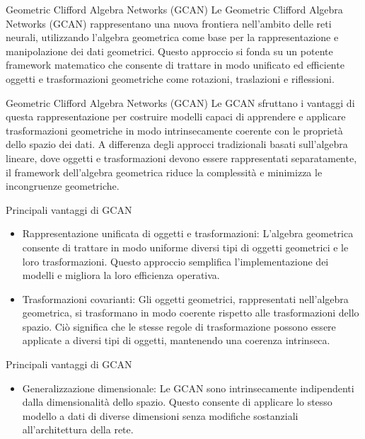 \begin{frame}{Geometric Clifford Algebra Networks (GCAN)}
   Le Geometric Clifford Algebra Networks (GCAN) rappresentano una nuova frontiera nell’ambito delle reti neurali, utilizzando l’algebra geometrica come base per la rappresentazione e manipolazione dei dati geometrici. 
   Questo approccio si fonda su un potente framework matematico che consente di trattare in modo unificato ed efficiente oggetti e trasformazioni geometriche come rotazioni, traslazioni e riflessioni.
\end{frame}

\begin{frame}{Geometric Clifford Algebra Networks (GCAN)}
   Le GCAN sfruttano i vantaggi di questa rappresentazione per costruire modelli capaci di apprendere e applicare trasformazioni geometriche in modo intrinsecamente coerente con le proprietà dello spazio dei dati. 
   A differenza degli approcci tradizionali basati sull’algebra lineare, dove oggetti e trasformazioni devono essere rappresentati separatamente, il framework dell’algebra geometrica riduce la complessità e minimizza le incongruenze geometriche.
\end{frame}

\begin{frame}{Principali vantaggi di GCAN}
   \begin{itemize}
      \item Rappresentazione unificata di oggetti e trasformazioni: 
      L’algebra geometrica consente di trattare in modo uniforme diversi tipi di oggetti geometrici e le loro trasformazioni. Questo approccio semplifica l’implementazione dei modelli e migliora la loro efficienza operativa.
      
      \item Trasformazioni covarianti: 
      Gli oggetti geometrici, rappresentati nell’algebra geometrica, si trasformano in modo coerente rispetto alle trasformazioni dello spazio. Ciò significa che le stesse regole di trasformazione possono essere applicate a diversi tipi di oggetti, mantenendo una coerenza intrinseca.
   \end{itemize}
\end{frame}

\begin{frame}{Principali vantaggi di GCAN}
   \begin{itemize}
      \item Generalizzazione dimensionale: 
      Le GCAN sono intrinsecamente indipendenti dalla dimensionalità dello spazio. Questo consente di applicare lo stesso modello a dati di diverse dimensioni senza modifiche sostanziali all’architettura della rete.
   \end{itemize}
\end{frame}

